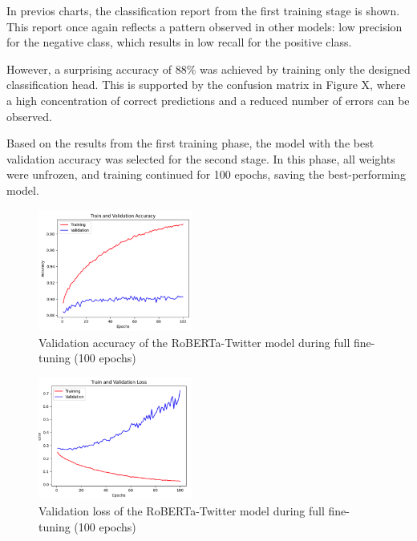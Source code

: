 In previos charts, the classification report from the first training stage is shown. This report once again reflects a pattern observed in other models: low precision for the negative class, which results in low recall for the positive class. 

However, a surprising accuracy of 88\% was achieved by training only the designed classification head. This is supported by the confusion matrix in Figure X, where a high concentration of correct predictions and a reduced number of errors can be observed.

Based on the results from the first training phase, the model with the best validation accuracy was selected for the second stage. In this phase, all weights were unfrozen, and training continued for 100 epochs, saving the best-performing model.


\begin{figure}[H]
    \centering
    \includegraphics[width=0.45\textwidth]{images/robertaValidationAccuray100Epoch.png}
    \caption{Validation accuracy of the RoBERTa-Twitter model during full fine-tuning (100 epochs)}
    \label{fig:roberta_validation_accuracy_100epoch}
\end{figure}

\begin{figure}[H]
    \centering
    \includegraphics[width=0.45\textwidth]{images/robertaValidationLost100Epoch.png}
    \caption{Validation loss of the RoBERTa-Twitter model during full fine-tuning (100 epochs)}
    \label{fig:roberta_validation_loss_100epoch}
\end{figure}

